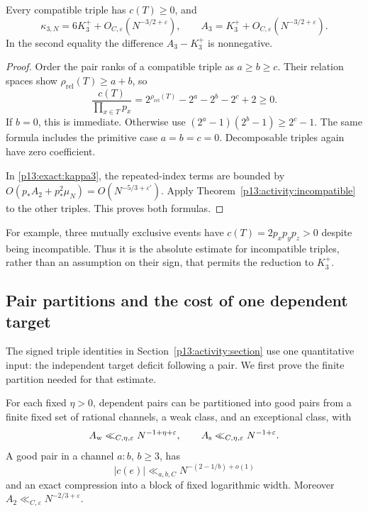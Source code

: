 \begin{proposition}
\label{p13:activity:kappa3}
Every compatible triple has \(c(T)\ge0\), and
\begin{equation}
 \kappa_{3,N}=6K_3^++O_{C,\varepsilon}(N^{-3/2+\varepsilon}),
 \qquad
 A_3=K_3^++O_{C,\varepsilon}(N^{-3/2+\varepsilon}).
 \label{p13:activity:kappa-comparison}
\end{equation}
In the second equality the difference \(A_3-K_3^+\)
is nonnegative.
\end{proposition}

\begin{proof}
Order the pair ranks of a compatible triple as
\(a\ge b\ge c\). Their relation spaces show
\(\rho_{\mathrm{rel}}(T)\ge a+b\), so
\[
 \frac{c(T)}{\prod_{x\in T}p_x}
  =2^{\rho_{\mathrm{rel}}(T)}-2^a-2^b-2^c+2\ge0.
\]
If \(b=0\), this is immediate. Otherwise use
\((2^a-1)(2^b-1)\ge2^c-1\).
The same formula includes the primitive case \(a=b=c=0\).
Decomposable triples again have zero coefficient.

In \eqref{p13:exact:kappa3}, the repeated-index terms
are bounded by \(O(p_*A_2+p_*^2\mu_N)
=O(N^{-5/3+\varepsilon'})\).
Apply Theorem~\ref{p13:activity:incompatible} to the
other triples. This proves both formulas.
\end{proof}

For example, three mutually exclusive events have
\(c(T)=2p_xp_yp_z>0\) despite being incompatible.
Thus it is the absolute estimate for incompatible
triples, rather than an assumption on their sign,
that permits the reduction to \(K_3^+\).

\subsection{Pair partitions and the cost of one dependent target}
\label{p14:comp:activity}

The signed triple identities in Section~\ref{p13:activity:section}
use one quantitative input: the independent target deficit following
a pair.  We first prove the finite partition needed for that estimate.

\begin{lemma}
\label{p13:activity:pair-partition}
For each fixed \(\eta>0\), dependent pairs can be partitioned
into good pairs from a finite fixed set of rational channels,
a weak class, and an exceptional class, with
\[
 A_{\rm w}\ll_{C,\eta,\varepsilon}N^{-1+\eta+\varepsilon},
 \qquad A_{\rm s}\ll_{C,\eta,\varepsilon}N^{-1+\varepsilon}.
\]
A good pair in a channel \(a:b\), \(b\ge3\), has
\[
 |c(e)|\ll_{a,b,C}N^{-(2-1/b)+o(1)}
\]
and an exact compression into a block of fixed logarithmic
width. Moreover \(A_2\ll_{C,\varepsilon}N^{-2/3+\varepsilon}\).
\end{lemma}


